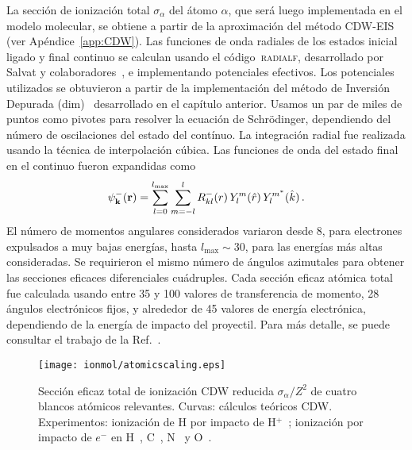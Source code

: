 La sección de ionización total $\sigma_{\alpha}$ del átomo $\alpha$, que 
será luego implementada en el modelo molecular, se obtiene a partir de la 
aproximación del método CDW-EIS (ver Apéndice~\ref{app:CDW}). Las 
funciones de onda radiales de los estados inicial ligado y final continuo 
se calculan usando el código~\textsc{radialf}, desarrollado por Salvat y 
colaboradores~\cite{salvat1995}, e implementando potenciales efectivos. 
Los potenciales utilizados se obtuvieron a partir de la implementación 
del método de Inversión Depurada (\acs{dim})~\cite{Mendez:16,Mendez:18} 
desarrollado en el capítulo anterior. Usamos un par de miles de puntos 
como pivotes para resolver la ecuación de Schr\"{o}dinger, dependiendo 
del número de oscilaciones del estado del contínuo. La integración radial 
fue realizada usando la técnica de interpolación cúbica. Las funciones de 
onda del estado final en el continuo fueron expandidas como
\begin{equation}
\psi_{\mbox{\scriptsize$\mathbf{k}$}}^-(\mathbf{r})=\sum_{l=0}^{l_{\max
}}\sum_{m=-l}^l R_{kl}^-(r)\,Y_l^m(\hat{r})\,Y_l^{m^*}
(\hat{k})\,.
\label{eq:contwave}
\end{equation}
El número de momentos angulares considerados variaron desde 8, para 
electrones expulsados a muy bajas energías, hasta $l_{\max}\sim 30$, para 
las energías más altas consideradas. Se requirieron el mismo número de 
ángulos azimutales para obtener las secciones eficaces diferenciales 
cuádruples. 
Cada sección eficaz atómica total fue calculada usando entre 35 y 100 
valores de transferencia de momento, 28 ángulos electrónicos fijos, y 
alrededor de 45 valores de energía electrónica, dependiendo de la energía 
de impacto del proyectil. Para más detalle, se puede consultar el trabajo
de la Ref.~\cite{montanari2017}. 

\begin{figure}
\centering
\texttt{[image: ionmol/atomicscaling.eps]}
\caption[Sección eficaz total de ionización atómica CDW reducida.]
{Sección eficaz total de ionización CDW reducida $\sigma_{\alpha}/Z^2$ 
de cuatro blancos atómicos relevantes. Curvas: cálculos teóricos CDW. 
Experimentos: ionización de H por impacto de H$^+$~\cite{Shah:81}; 
ionización por impacto de $e^-$ en H~\cite{Shah:87}, C~\cite{Brook:78}, 
N~\cite{Brook:78} y O~\cite{Thompson:95}.}
\label{fig:atomscaling}
\end{figure} 

